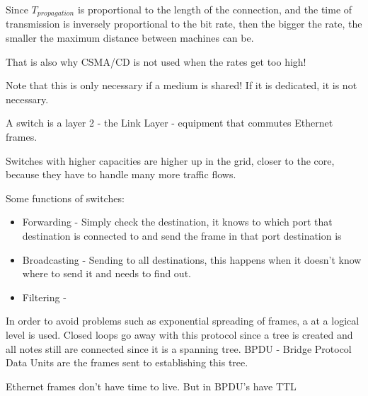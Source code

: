 
Since $T_{propagation}$ is proportional to the length of the connection, and the time of transmission is inversely proportional to the bit rate, then the bigger the rate, the smaller the maximum distance between machines can be. 

That is also why CSMA/CD is not used when the rates get too high!



Note that this is only necessary if a medium is shared! If it is dedicated, it is not necessary.


A switch is a layer 2 - the Link Layer - equipment that commutes Ethernet frames. 




Switches with higher capacities are higher up in the grid, closer to the core, because they have to handle many more traffic flows.

Some functions of switches:
\begin{itemize}
    \item Forwarding - Simply check the destination, it knows to which port that destination is connected to and send the frame in that port destination is 
    \item Broadcasting - Sending to all destinations, this happens when it doesn't know where to send it and needs to find out. 
    \item Filtering - 
\end{itemize} 

In order to avoid problems such as exponential spreading of frames, a  at a logical level is used. Closed loops go away with this protocol since a tree is created and all notes still are connected since it is a spanning tree. BPDU - Bridge Protocol Data Units are the frames sent to establishing this tree.


Ethernet frames don't have time to live. But in BPDU's have TTL 


